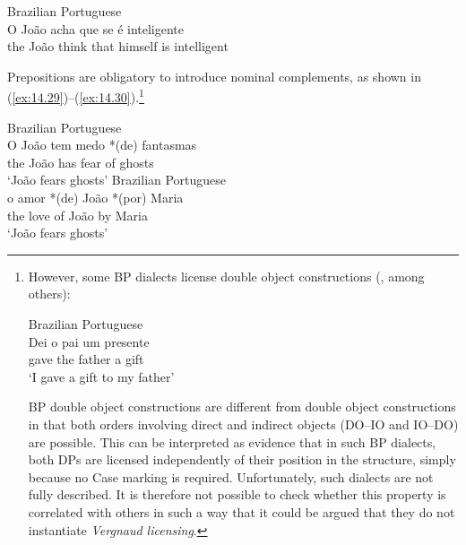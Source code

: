 \documentclass[output=paper]{langsci/langscibook}
\begin{document}
\ea\label{ex:14.28}Brazilian Portuguese\\
    \gll    \llap{*}O João acha que se é inteligente\\
            the João think that himself is intelligent\\
\z


Prepositions are obligatory to introduce nominal complements, as shown in
(\ref{ex:14.29})--(\ref{ex:14.30}).\footnote{However, some \gls{BP}
    dialects license double object constructions
    (\citealt{Scher1996,LucchesiMello2009}, among others):

\begin{exe}
    Brazilian Portuguese\\
    \gll    Dei o pai um presente\\
            gave the father a gift\\
    \glt    ‘I gave a gift to my father’
\end{exe}

\gls{BP} double object constructions are different from  double object
constructions in that both orders involving direct and indirect objects
(\gls{DO}--\gls{IO} and \gls{IO}--\gls{DO}) are
possible. This can be interpreted as evidence that in such \gls{BP} dialects,
both DPs are licensed independently of their position in the structure, simply
because no Case marking is required.  Unfortunately, such dialects are not
fully described. It is therefore not possible to check whether this property is
correlated with others in such a way that it could be argued that they do not
instantiate \emph{Vergnaud licensing}.}

\ea\label{ex:14.29}Brazilian Portuguese\\
    \gll    \llap{*}O João tem medo *(de) fantasmas\\
            the João has fear \hphantom{*(}of ghosts\\
    \glt    \enquote*{João fears ghosts}
\ex\label{ex:14.30}Brazilian Portuguese\\
    \gll    o amor *(de) João *(por) Maria\\
            the love \hphantom{*(}of João \hphantom{*(}by Maria\\
    \glt    \enquote*{João fears ghosts}
\z
\end{document}
